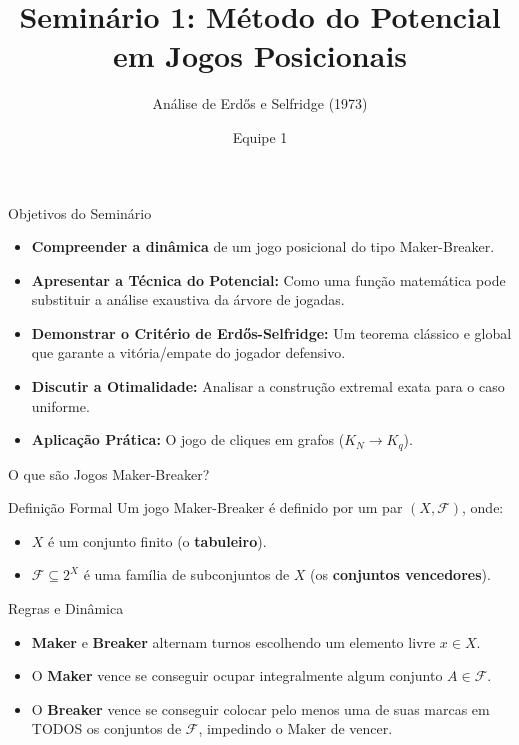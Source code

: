\documentclass[11pt, aspectratio=169]{beamer}
\title[Método do Potencial]{Seminário 1: Método do Potencial em Jogos Posicionais}
\subtitle{Análise de Erdős e Selfridge (1973)}
\author{Equipe 1}
\institute{Combinatória Extremal e Probabilística}
\date{}
\begin{document}
\begin{frame}
    \titlepage
\end{frame}

\begin{frame}{Objetivos do Seminário}
    \begin{itemize}
        \item \textbf{Compreender a dinâmica} de um jogo posicional do tipo Maker-Breaker.
        \item \textbf{Apresentar a Técnica do Potencial:} Como uma função matemática pode substituir a análise exaustiva da árvore de jogadas.
        \item \textbf{Demonstrar o Critério de Erdős-Selfridge:} Um teorema clássico e global que garante a vitória/empate do jogador defensivo.
        \item \textbf{Discutir a Otimalidade:} Analisar a construção extremal exata para o caso uniforme.
        \item \textbf{Aplicação Prática:} O jogo de cliques em grafos ($K_N \to K_q$).
    \end{itemize}
\end{frame}

\begin{frame}{O que são Jogos Maker-Breaker?}
    \begin{block}{Definição Formal}
        Um jogo Maker-Breaker é definido por um par $(X, \mathcal{F})$, onde:
        \begin{itemize}
            \item $X$ é um conjunto finito (o \textbf{tabuleiro}).
            \item $\mathcal{F} \subseteq 2^X$ é uma família de subconjuntos de $X$ (os \textbf{conjuntos vencedores}).
        \end{itemize}
    \end{block}
    
    \begin{block}{Regras e Dinâmica}
        \begin{itemize}
            \item \textbf{Maker} e \textbf{Breaker} alternam turnos escolhendo um elemento livre $x \in X$.
            \item O \textbf{Maker} vence se conseguir ocupar integralmente algum conjunto $A \in \mathcal{F}$.
            \item O \textbf{Breaker} vence se conseguir colocar pelo menos uma de suas marcas em TODOS os conjuntos de $\mathcal{F}$, impedindo o Maker de vencer.
        \end{itemize}
    \end{block}
\end{frame}
\end{document}
